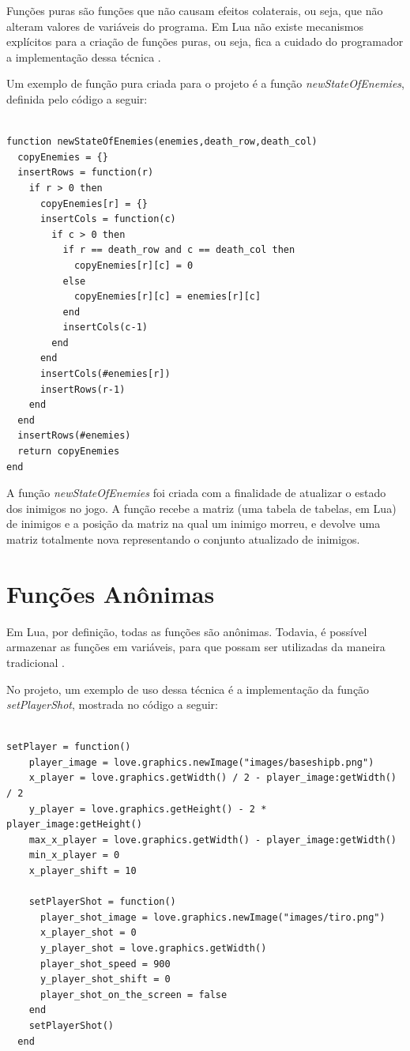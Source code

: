 \documentclass[rel_mlp]{iiufrgs}
\begin{document}
Funções puras são funções que não causam efeitos colaterais, ou seja, que não alteram valores de variáveis do programa. Em Lua não existe mecanismos explícitos para a criação de funções puras, ou seja, fica a cuidado do programador a implementação dessa técnica \cite{ImmutableObjectsLua}.

Um exemplo de função pura criada para o projeto é a função \textit{newStateOfEnemies}, definida pelo código a seguir:

\begin{lstlisting}[frame=single]

function newStateOfEnemies(enemies,death_row,death_col)
  copyEnemies = {}
  insertRows = function(r)
    if r > 0 then
      copyEnemies[r] = {}
      insertCols = function(c)
        if c > 0 then
          if r == death_row and c == death_col then
            copyEnemies[r][c] = 0
          else
            copyEnemies[r][c] = enemies[r][c]
          end
          insertCols(c-1)
        end
      end
      insertCols(#enemies[r])
      insertRows(r-1)
    end
  end
  insertRows(#enemies)
  return copyEnemies
end

\end{lstlisting}

A função \textit{newStateOfEnemies} foi criada com a finalidade de atualizar o estado dos inimigos no jogo. A função recebe a matriz (uma tabela de tabelas, em Lua) de inimigos e a posição da matriz na qual um inimigo morreu, e devolve uma matriz totalmente nova representando o conjunto atualizado de inimigos. 


\section{Funções Anônimas}

Em Lua, por definição, todas as funções são anônimas. Todavia, é possível armazenar as funções em variáveis, para que possam ser utilizadas da maneira tradicional \cite{IntroLuaPDF}.

No projeto, um exemplo de uso dessa técnica é a implementação da função \textit{setPlayerShot}, mostrada no código a seguir:

\begin{lstlisting}

setPlayer = function()
    player_image = love.graphics.newImage("images/baseshipb.png")
    x_player = love.graphics.getWidth() / 2 - player_image:getWidth() / 2
    y_player = love.graphics.getHeight() - 2 * player_image:getHeight()
    max_x_player = love.graphics.getWidth() - player_image:getWidth()
    min_x_player = 0
    x_player_shift = 10

    setPlayerShot = function()
      player_shot_image = love.graphics.newImage("images/tiro.png")
      x_player_shot = 0
      y_player_shot = love.graphics.getWidth()
      player_shot_speed = 900
      y_player_shot_shift = 0
      player_shot_on_the_screen = false
    end
    setPlayerShot()
  end
    
\end{lstlisting}
\end{document}
